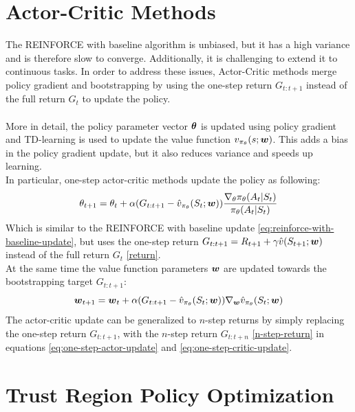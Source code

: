 \section{Actor-Critic Methods}
The REINFORCE with baseline algorithm is unbiased, but it has a high variance and is therefore slow to converge. Additionally, it is challenging to extend it to continuous tasks. In order to address these issues, Actor-Critic methods merge policy gradient and bootstrapping by using the one-step return $G_{t:t+1}$ instead of the full return $G_t$ to update the policy.\\\\
More in detail, the policy parameter vector $\boldsymbol{\theta}$ is updated using policy gradient and TD-learning is used to update the value function $v_{\pi_{\theta}}(s; \boldsymbol{w})$. This adds a bias in the policy gradient update, but it also reduces variance and speeds up learning.\\
In particular, one-step actor-critic methods update the policy as following:
\begin{equation}
    \theta_{t+1} = \theta_t + \alpha (G_{t:t+1} - \hat{v}_{\pi_{\theta}}(S_t; \boldsymbol{w})) \frac{\nabla_{\theta} \pi_{\theta}(A_t|S_t)}{\pi_{\theta}(A_t|S_t)}
    \label{eq:one-step-actor-update}
\end{equation}
Which is similar to the REINFORCE with baseline update \eqref{eq:reinforce-with-baseline-update}, but uses the one-step return $G_{t:t+1} = R_{t+1} + \gamma \hat{v}(S_{t+1}; \boldsymbol{w})$ instead of the full return $G_t$ \eqref{return}.\\
At the same time the value function parameters $\boldsymbol{w}$ are updated towards the bootstrapping target $G_{t:t+1}$:
\begin{equation}
    \boldsymbol{w}_{t+1} = \boldsymbol{w}_t + \alpha (G_{t:t+1} - \hat{v}_{\pi_{\theta}}(S_t; \boldsymbol{w})) \nabla_{\boldsymbol{w}} \hat{v}_{\pi_{\theta}}(S_t; \boldsymbol{w})
    \label{eq:one-step-critic-update}
\end{equation}
The actor-critic update can be generalized to $n$-step returns by simply replacing the one-step return $G_{t:t+1}$, with the $n$-step return $G_{t:t+n}$ \eqref{n-step-return} in equations \eqref{eq:one-step-actor-update} and \eqref{eq:one-step-critic-update}.\\

\section{Trust Region Policy Optimization}